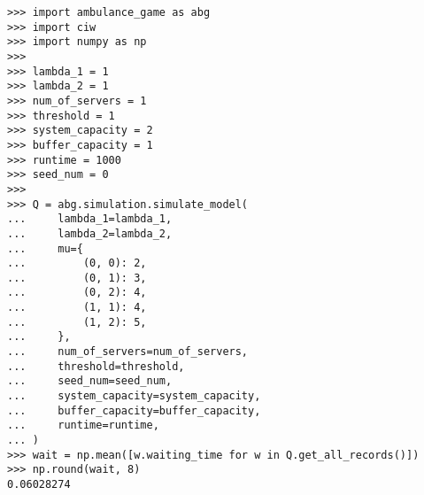 \begin{lstlisting}[style=pystyle]
>>> import ambulance_game as abg
>>> import ciw
>>> import numpy as np
>>>
>>> lambda_1 = 1
>>> lambda_2 = 1
>>> num_of_servers = 1
>>> threshold = 1
>>> system_capacity = 2
>>> buffer_capacity = 1
>>> runtime = 1000
>>> seed_num = 0
>>>
>>> Q = abg.simulation.simulate_model(
...     lambda_1=lambda_1,
...     lambda_2=lambda_2,
...     mu={
...         (0, 0): 2,
...         (0, 1): 3,
...         (0, 2): 4,
...         (1, 1): 4,
...         (1, 2): 5,
...     },
...     num_of_servers=num_of_servers,
...     threshold=threshold,
...     seed_num=seed_num,
...     system_capacity=system_capacity,
...     buffer_capacity=buffer_capacity,
...     runtime=runtime,
... )
>>> wait = np.mean([w.waiting_time for w in Q.get_all_records()])
>>> np.round(wait, 8)
0.06028274

\end{lstlisting}
